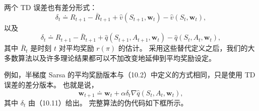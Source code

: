 \documentclass[UTF8,12pt,a4paper,fontset=fandol]{ctexart}
\begin{document}
两个 TD 误差也有差分形式：
\begin{equation}
\delta_t\doteq R_{t+1}-\bar R_{t+1}+\hat v(S_{t+1},\mathbf{w}_t)-\hat v(S_t,\mathbf{w}_t),
\tag{10.10}
\end{equation}
以及
\begin{equation}
\delta_t\doteq R_{t+1}-\bar R_{t+1}+\hat q(S_{t+1},A_{t+1},\mathbf{w}_t)-\hat q(S_t,A_t,\mathbf{w}_t),
\tag{10.11}
\end{equation}
其中 $\bar R_t$ 是时刻 $t$ 对平均奖励 $r(\pi)$ 的估计。
采用这些替代定义之后，我们的大多数算法以及许多理论结果都可以不加改变地延伸到平均奖励设定。

例如，半梯度 Sarsa 的平均奖励版本与（10.2）中定义的方式相同，只是使用 TD 误差的差分版本。
也就是说，
\begin{equation}
\mathbf{w}_{t+1}\doteq \mathbf{w}_t+\alpha\delta_t\nabla\hat q(S_t,A_t,\mathbf{w}_t),
\tag{10.12}
\end{equation}
其中 $\delta_t$ 由（10.11）给出。
完整算法的伪代码如下框所示。

\begin{center}
\end{center}
\end{document}
